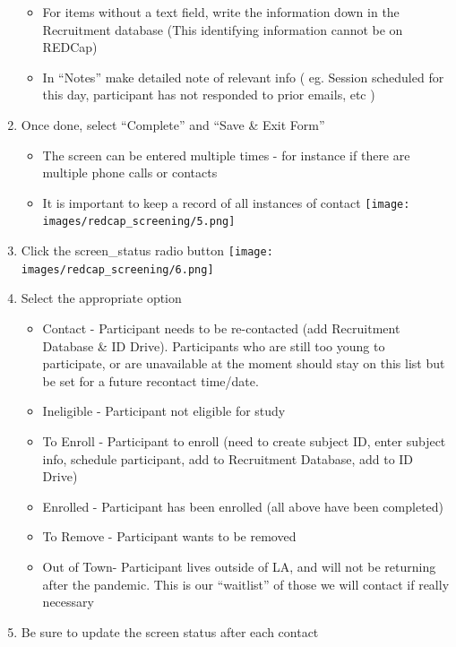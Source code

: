 \documentclass[
]{book}
\providecommand{\tightlist}{%
  \setlength{\itemsep}{0pt}\setlength{\parskip}{0pt}}
\begin{document}
\begin{enumerate}
  \begin{itemize}
  \tightlist
  \item
    For items without a text field, write the information down in the Recruitment database (This identifying information cannot be on REDCap)
  \item
    In ``Notes'' make detailed note of relevant info ( eg. Session scheduled for this day, participant has not responded to prior emails, etc )
  \end{itemize}
\item
  Once done, select ``Complete'' and ``Save \& Exit Form''

  \begin{itemize}
  \tightlist
  \item
    The screen can be entered multiple times - for instance if there are multiple phone calls or contacts
  \item
    It is important to keep a record of all instances of contact
    \texttt{[image: images/redcap\_screening/5.png]}
  \end{itemize}
\item
  Click the screen\_status radio button
  \texttt{[image: images/redcap\_screening/6.png]}
\item
  Select the appropriate option

  \begin{itemize}
  \tightlist
  \item
    Contact - Participant needs to be re-contacted (add Recruitment Database \& ID Drive). Participants who are still too young to participate, or are unavailable at the moment should stay on this list but be set for a future recontact time/date.
  \item
    Ineligible - Participant not eligible for study
  \item
    To Enroll - Participant to enroll (need to create subject ID, enter subject info, schedule participant, add to Recruitment Database, add to ID Drive)
  \item
    Enrolled - Participant has been enrolled (all above have been completed)
  \item
    To Remove - Participant wants to be removed
  \item
    Out of Town- Participant lives outside of LA, and will not be returning after the pandemic. This is our ``waitlist'' of those we will contact if really necessary
  \end{itemize}
\item
  Be sure to update the screen status after each contact


\end{enumerate}
\end{document}
